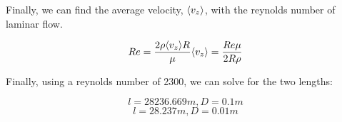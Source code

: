 \documentclass{article}
\begin{document}
Finally, we can find the average velocity, $\langle v_z \rangle$, with the reynolds number of laminar flow. 

\begin{equation}
    Re = \frac{2\rho \langle v_z \rangle R}{\mu}
    \langle v_z \rangle = \frac{Re \mu}{2R\rho}
\end{equation}

Finally, using a reynolds number of 2300, we can solve for the two lengths:

\begin{equation}
    \boxed{l = 28236.669 m, D = 0.1 m}
\end{equation}
\begin{equation}
    \boxed{l = 28.237 m, D = 0.01 m}
\end{equation}
\end{document}

